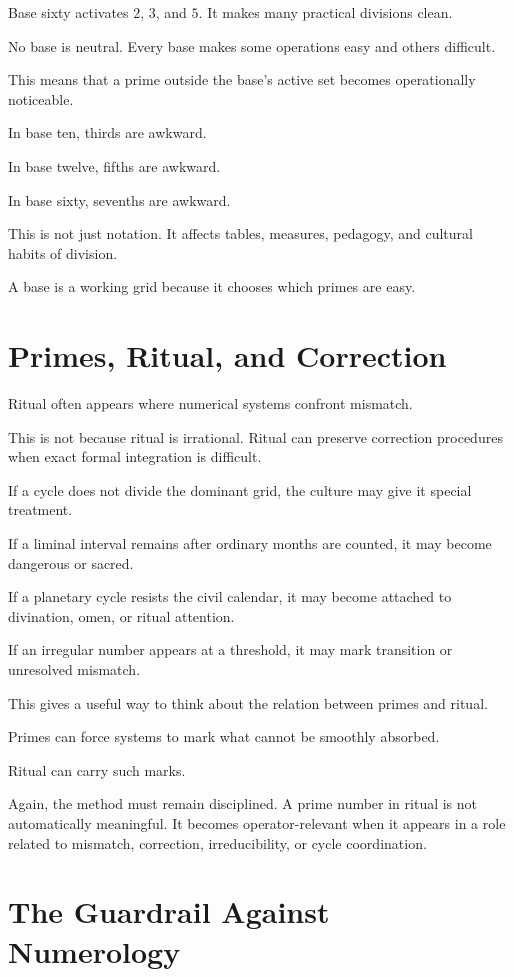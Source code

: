 \documentclass[11pt]{book}
\begin{document}
Base sixty activates \(2\), \(3\), and \(5\). It makes many practical divisions clean.

No base is neutral. Every base makes some operations easy and others difficult.

This means that a prime outside the base's active set becomes operationally noticeable.

In base ten, thirds are awkward.

In base twelve, fifths are awkward.

In base sixty, sevenths are awkward.

This is not just notation. It affects tables, measures, pedagogy, and cultural habits of division.

A base is a working grid because it chooses which primes are easy.

\section{Primes, Ritual, and Correction}

Ritual often appears where numerical systems confront mismatch.

This is not because ritual is irrational. Ritual can preserve correction procedures when exact formal integration is difficult.

If a cycle does not divide the dominant grid, the culture may give it special treatment.

If a liminal interval remains after ordinary months are counted, it may become dangerous or sacred.

If a planetary cycle resists the civil calendar, it may become attached to divination, omen, or ritual attention.

If an irregular number appears at a threshold, it may mark transition or unresolved mismatch.

This gives a useful way to think about the relation between primes and ritual.

Primes can force systems to mark what cannot be smoothly absorbed.

Ritual can carry such marks.

Again, the method must remain disciplined. A prime number in ritual is not automatically meaningful. It becomes operator-relevant when it appears in a role related to mismatch, correction, irreducibility, or cycle coordination.

\section{The Guardrail Against Numerology}
\end{document}
